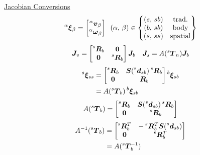 \documentclass[twocolumn]{article}    %
\begin{document}
\newpage
\noindent\underline{Jacobian Conversions}
\begin{equation*}
    \prescript{\alpha}{}{\bm{\xi}}_{\beta} = \begin{bmatrix}
        \prescript{\alpha}{}{\bm{v}}_{\beta} \\ \prescript{\alpha}{}{\bm{\omega}}_{\beta}
    \end{bmatrix} \hspace{5pt} (\alpha,\,\beta) \in \left\{\begin{matrix}
        (s,\,sb) & \text{trad.}\\
        (b,\,sb) & \text{body}\\
        (s,\,ss) & \text{spatial}
    \end{matrix}\right\}
\end{equation*}
\begin{equation*}
    \bm{J}_v = \begin{bmatrix}
        \prescript{s}{}{\bm{R}}_b & \bm{0}\\ \bm{0} & \prescript{s}{}{\bm{R}}_b
    \end{bmatrix}\bm{J}_b \hspace{10pt} \bm{J}_s = A(\prescript{s}{}{\bm{T}}_n)\bm{J}_b
\end{equation*}
\begin{align*}
    \prescript{s}{}{\bm{\xi}}_{ss} &= \begin{bmatrix}
        \prescript{s}{}{\bm{R}}_b & \bm{S}(\prescript{s}{}{\bm{d}_{sb})\prescript{s}{}{\bm{R}}_b}\\
        \bm{0} & \prescript{}{}{\bm{R}}_b
    \end{bmatrix}\prescript{b}{}{\bm{\xi}}_{sb}\\
    &= A(\prescript{s}{}{\bm{T}}_b) \prescript{b}{}{\bm{\xi}}_{sb}
\end{align*}
\begin{align*}
    A(\prescript{s}{}{\bm{T}}_b) = \begin{bmatrix}
        \prescript{s}{}{\bm{R}}_b & \bm{S}(\prescript{s}{}{\bm{d}}_{sb}) \prescript{s}{}{\bm{R}}_b \\ \bm{0} & \prescript{s}{}{\bm{R}}_b
    \end{bmatrix}
\end{align*}
\begin{align*}
        A^{-1}(\prescript{s}{}{\bm{T}}_b) &= \begin{bmatrix}
        \prescript{s}{}{\bm{R}}_b^T & -\prescript{s}{}{\bm{R}}_b^T\bm{S}(\prescript{s}{}{\bm{d}_{sb}}) \\ \bm{0} & \prescript{s}{}{\bm{R}}_b^T
    \end{bmatrix}\\ 
    &= A(\prescript{s}{}{\bm{T}}_b^{-1})
\end{align*}
\end{document}
